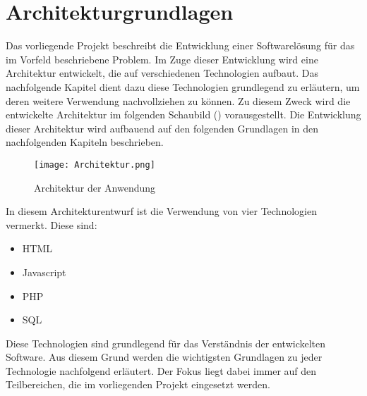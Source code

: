 \section{Architekturgrundlagen}
\label{sec:Architekturgrundlagen}

Das vorliegende Projekt beschreibt die Entwicklung einer Softwarelösung für das im Vorfeld beschriebene Problem.
Im Zuge dieser Entwicklung wird eine Architektur entwickelt, die auf verschiedenen Technologien aufbaut.
Das nachfolgende Kapitel dient dazu diese Technologien grundlegend zu erläutern, um deren weitere Verwendung
nachvollziehen zu können. Zu diesem Zweck wird die entwickelte Architektur im folgenden Schaubild () vorausgestellt.
Die Entwicklung dieser Architektur wird aufbauend auf den folgenden Grundlagen in den nachfolgenden Kapiteln beschrieben.

\begin{figure}[htb]
\centering
\texttt{[image: Architektur.png]}
\caption[Architektur der Anwendung]{Architektur der
Anwendung\protect\footnotemark}
\label{fig:Architektur}
\end{figure}


In diesem Architekturentwurf ist die Verwendung von vier Technologien vermerkt. Diese sind:
\begin{itemize}
  \item HTML
  \item Javascript
  \item PHP
  \item SQL
\end{itemize}

Diese Technologien sind grundlegend für das Verständnis der entwickelten Software.
Aus diesem Grund werden die wichtigsten Grundlagen zu jeder Technologie nachfolgend erläutert.
Der Fokus liegt dabei immer auf den Teilbereichen, die im vorliegenden Projekt eingesetzt werden.
